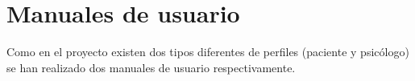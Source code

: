 \chapter{Manuales de usuario}

Como en el proyecto existen dos tipos diferentes de perfiles (paciente y psicólogo) se han realizado dos manuales de usuario respectivamente.



\newpage

